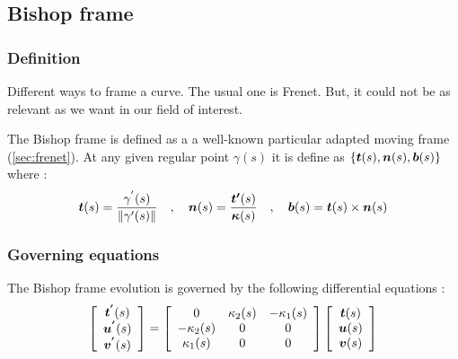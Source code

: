 
\subsection{Bishop frame}

\subsubsection{Definition}
Different ways to frame a curve. The usual one is Frenet. But, it could not be as relevant as we want in our field of interest.

The Bishop frame is defined as a a well-known particular adapted moving frame (\autoref{sec:frenet}). At any given regular point $\gamma(s)$ it is define as $\{\boldsymbol{t}(s),\boldsymbol{n}(s),\boldsymbol{b}(s)\}$ where : 
\begin{gather}
\boldsymbol{t}(s) = \frac{\gamma^{'}(s)}{\|\gamma'(s)\|}
\quad,\quad
\boldsymbol{n}(s) = \frac{\boldsymbol{t'}(s)}{\boldsymbol{\kappa}(s)}
\quad,\quad
\boldsymbol{b}(s)= \boldsymbol{t}(s)\times\boldsymbol{n}(s)
\end{gather}

\subsubsection{Governing equations}
The Bishop frame evolution is governed by the following differential equations :
\begin{gather}
\left[\begin{array}{c}
\boldsymbol{t^{'}}(s) \\
\boldsymbol{u^{'}}(s) \\
\boldsymbol{v^{'}}(s)
\end{array}\right]
=
\left[\begin{array}{ccc}
0 & \kappa_{2}(s) & -\kappa_{1}(s) \\
-\kappa_{2}(s) & 0 & 0 \\
\kappa_{1}(s) & 0 & 0
\end{array}\right]
\left[\begin{array}{c}
\boldsymbol{t}(s) \\
\boldsymbol{u}(s) \\
\boldsymbol{v}(s)
\end{array}\right]
\end{gather}

